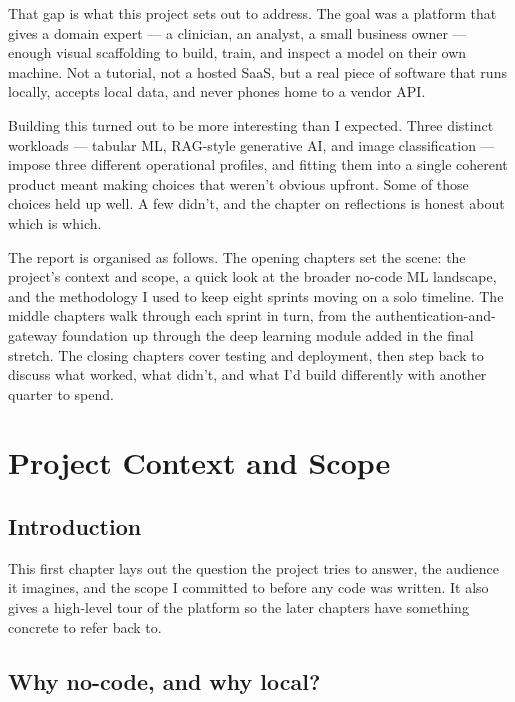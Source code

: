 \documentclass[12pt, a4paper]{report}
\begin{document}
That gap is what this project sets out to address. The goal was a
platform that gives a domain expert --- a clinician, an analyst, a small
business owner --- enough visual scaffolding to build, train, and inspect
a model on their own machine. Not a tutorial, not a hosted SaaS, but a
real piece of software that runs locally, accepts local data, and never
phones home to a vendor API.

Building this turned out to be more interesting than I expected. Three
distinct workloads --- tabular ML, RAG-style generative AI, and image
classification --- impose three different operational profiles, and
fitting them into a single coherent product meant making choices that
weren't obvious upfront. Some of those choices held up well. A few
didn't, and the chapter on reflections is honest about which is which.

The report is organised as follows. The opening chapters set the scene:
the project's context and scope, a quick look at the broader no-code ML
landscape, and the methodology I used to keep eight sprints moving on a
solo timeline. The middle chapters walk through each sprint in turn,
from the authentication-and-gateway foundation up through the deep
learning module added in the final stretch. The closing chapters cover
testing and deployment, then step back to discuss what worked, what
didn't, and what I'd build differently with another quarter to spend.

\newpage

\chapter{Project Context and Scope}

\section*{Introduction}

This first chapter lays out the question the project tries to answer,
the audience it imagines, and the scope I committed to before any code
was written. It also gives a high-level tour of the platform so the
later chapters have something concrete to refer back to.

\section{Why no-code, and why local?}
\end{document}
